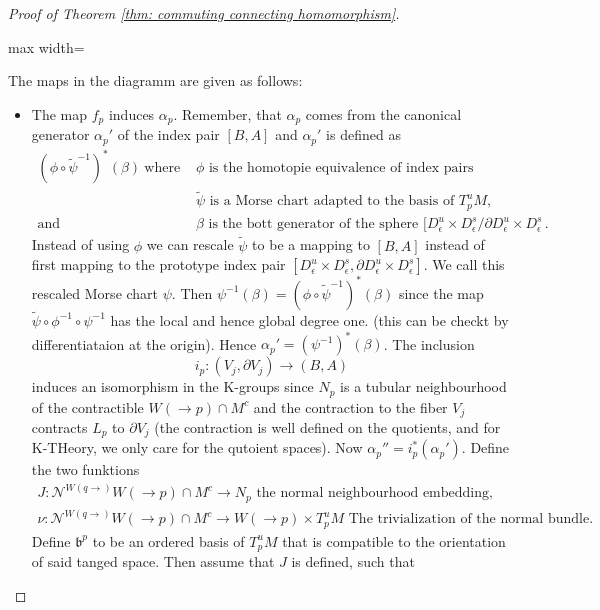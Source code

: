 \begin{proof}[Proof of Theorem \ref{thm: commuting connecting homomorphism}]
\begin{fdiagram}
\begin{adjustbox}{max width=\textwidth}
\begin{tikzcd}
				\end{tikzcd}
			\end{adjustbox}
		\end{fdiagram}
		The maps in the diagramm are given as follows:
		\begin{itemize}
			\item The map $f_p$ induces $\alpha_p$. Remember, that $\alpha_p$ comes from the canonical generator $\alpha_p'$ of the index pair $[B,A]$ and $\alpha_p'$ is defined as
			\begin{align*}
				(\phi\circ{ \tilde{\psi}}^{-1})^*(\beta)~\text{where }& \phi \text{ is the homotopie equivalence of index pairs}\\
				& \tilde{\psi} \text{ is a Morse chart adapted to the basis of } T^u_pM,\\
				\text{and }& \beta \text{ is the bott generator of the sphere } [D^u_\epsilon\times D^s_\epsilon\Big/ \partial D^u_\epsilon\times D^s_\epsilon
				\,				.
			\end{align*} Instead of using $\phi$ we can rescale $\tilde{\psi}$ to be a mapping to $[B,A]$ instead of first mapping to the prototype index pair $[D^u_\epsilon\times D^s_\epsilon,\partial D^u_\epsilon\times D^s_\epsilon]$. 
			We call this rescaled Morse chart $\psi$. 
			Then $\psi^{-1}(\beta)= (\phi\circ{ \tilde{\psi}}^{-1})^*(\beta)$ since the map $\tilde{\psi}\circ \phi^{-1}\circ \psi^{-1}$ has the local and hence global degree one. (this can be checkt by differentiataion at the origin). Hence $\alpha_p'=(\psi^{-1})^*(\beta)$. The inclusion 
			\begin{equation*}
				i_p: (V_j,\partial V_j)\to (B,A)
			\end{equation*} induces an isomorphism in the K-groups since $N_p$ is a tubular neighbourhood of the contractible $W(\to p)\cap M^c$ and the contraction to the fiber $V_j$ contracts $L_p$ to $\partial V_j$ (the contraction is well defined on the quotients, and for K-THeory, we only care for the qutoient spaces). Now $\alpha_p''=i_p^*(\alpha_p')$. Define the two funktions
			\begin{align*}
				J: \mathcal{N}^{W(q\to)} W(\to p)\cap M^c \to N_p \text{ the normal neighbourhood embedding,  }\\
				\nu: \mathcal{N}^{W(q\to)} W(\to p)\cap M^c \to  W(\to p)  \times T^u_pM \text{ The trivialization of the normal bundle.}  
			\end{align*}
			Define $\mathfrak{b}^p$ to be an ordered basis of $T^u_pM $ that is compatible to the orientation of said tanged space. Then assume that $J$ is defined, such that 

\end{itemize}
\end{proof}
